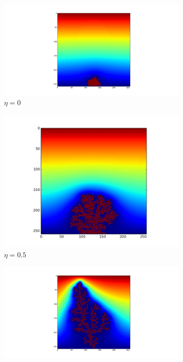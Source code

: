 \documentclass[a4paper]{article}
\begin{document}
\begin{figure}[ht] 
  \begin{subfigure}[b]{0.5\linewidth}
    \centering
    \includegraphics[width=\linewidth, trim={7cm 1.8cm 7cm 1cm},clip]{DLA_eta00.png} 
    \caption{$\eta = 0$} 
    \label{fig:DLA_eta00} 
  \end{subfigure}%
  \begin{subfigure}[b]{0.5\linewidth}
    \centering
    \includegraphics[width=\linewidth, trim={0cm 1cm 0cm 0cm},clip]{DLA_eta05.png} 
    \caption{$\eta = 0.5$} 
    \label{fig:DLA_eta05} 
  \end{subfigure} 
  \begin{subfigure}[b]{0.5\linewidth}
    \centering
    \includegraphics[width=\linewidth, trim={7cm 1.8cm 7cm 1cm},clip]{DLA_eta10.png} 

\end{subfigure}
\end{figure}
\end{document}
